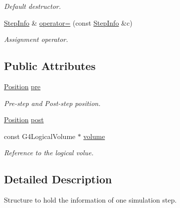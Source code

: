 \begin{DoxyCompactItemize}
\begin{DoxyCompactList}\small\item\em Default destructor. \item\end{DoxyCompactList}\item 
\hyperlink{class_d_d4hep_1_1_simulation_1_1_geant4_material_scanner_1_1_step_info}{StepInfo} \& \hyperlink{class_d_d4hep_1_1_simulation_1_1_geant4_material_scanner_1_1_step_info_aa9a39c227e53f039bdd9620b1335bd84}{operator=} (const \hyperlink{class_d_d4hep_1_1_simulation_1_1_geant4_material_scanner_1_1_step_info}{StepInfo} \&c)
\begin{DoxyCompactList}\small\item\em Assignment operator. \item\end{DoxyCompactList}\end{DoxyCompactItemize}
\subsection*{Public Attributes}
\begin{DoxyCompactItemize}
\item 
\hyperlink{namespace_d_d4hep_1_1_simulation_ad6fd94b3439e31d1ba4b2e640d578558}{Position} \hyperlink{class_d_d4hep_1_1_simulation_1_1_geant4_material_scanner_1_1_step_info_a8a5e62192e0103b052eb2c5885366aec}{pre}
\begin{DoxyCompactList}\small\item\em Pre-\/step and Post-\/step position. \item\end{DoxyCompactList}\item 
\hyperlink{namespace_d_d4hep_1_1_simulation_ad6fd94b3439e31d1ba4b2e640d578558}{Position} \hyperlink{class_d_d4hep_1_1_simulation_1_1_geant4_material_scanner_1_1_step_info_a0fd16194cb4eeb622e8e1485d3881688}{post}
\item 
const G4LogicalVolume $\ast$ \hyperlink{class_d_d4hep_1_1_simulation_1_1_geant4_material_scanner_1_1_step_info_ac413cc2216dfa5d0d174c48fd4acbe5b}{volume}
\begin{DoxyCompactList}\small\item\em Reference to the logical volue. \item\end{DoxyCompactList}\end{DoxyCompactItemize}


\subsection{Detailed Description}
Structure to hold the information of one simulation step. 

